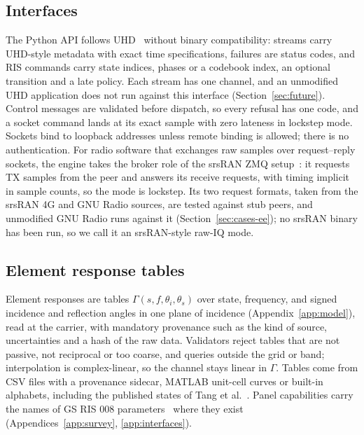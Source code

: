 \subsection{Interfaces}\label{sec:design-if}
The Python API follows UHD~\cite{UHDManual} without binary compatibility: streams
carry UHD-style metadata with exact time specifications, failures are status codes, and RIS
commands carry state indices, phases or a codebook index, an optional transition and a late
policy. Each stream has one channel, and an unmodified UHD application does not run against
this interface (Section~\ref{sec:future}). Control messages are validated
before dispatch, so every refusal has one code, and a socket command lands at its exact sample
with zero lateness in lockstep mode. Sockets bind to loopback addresses
unless remote binding is allowed; there is no authentication.
For radio software that exchanges raw samples over request--reply sockets, the
engine takes the broker role of the srsRAN ZMQ setup~\cite{srsRANZMQ}: it requests TX samples
from the peer and answers its receive requests, with timing implicit in sample counts, so the
mode is lockstep. Its two request formats, taken from the srsRAN 4G and GNU Radio sources, are
tested against stub peers, and unmodified GNU Radio \txtEeGrVersion{} runs against it
(Section~\ref{sec:cases-ee}); no srsRAN binary has been run, so we call it an srsRAN-style
raw-IQ mode.

\subsection{Element response tables}\label{sec:design-states}
Element responses are tables $\Gamma(s,f,\theta_i,\theta_s)$ over state,
frequency, and signed incidence and reflection angles in one plane of incidence
(Appendix~\ref{app:model}), read at the carrier, with mandatory provenance such as the kind of
source, uncertainties and a hash of the raw data.
Validators reject tables that are not passive, not reciprocal or too
coarse, and queries outside the grid or band; interpolation is complex-linear, so the
channel stays linear in $\Gamma$. Tables come from CSV files with a
provenance sidecar, MATLAB unit-cell curves or built-in alphabets, including the published
states of Tang et al.~\cite{Tang2022mmWave}. Panel capabilities carry the names
of GS RIS 008 parameters~\cite{ETSI_GS_RIS008} where they exist (Appendices~\ref{app:survey},
\ref{app:interfaces}).

